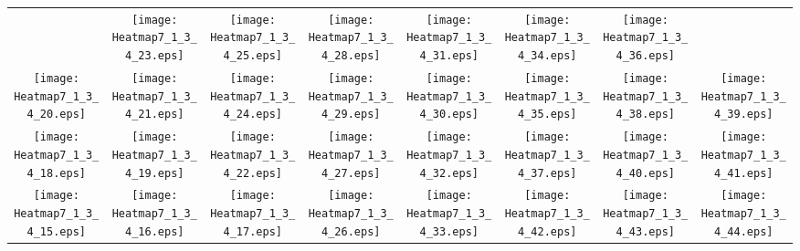 \documentclass{standalone}
\begin{document}
\renewcommand{\arraystretch}{0}
\setlength{\tabcolsep}{0pt}
\begin{tabular}{ *8{c} }
 & \texttt{[image: Heatmap7\_1\_3\_4\_23.eps]} & \texttt{[image: Heatmap7\_1\_3\_4\_25.eps]} & \texttt{[image: Heatmap7\_1\_3\_4\_28.eps]} & \texttt{[image: Heatmap7\_1\_3\_4\_31.eps]} & \texttt{[image: Heatmap7\_1\_3\_4\_34.eps]} & \texttt{[image: Heatmap7\_1\_3\_4\_36.eps]} &  \\
\texttt{[image: Heatmap7\_1\_3\_4\_20.eps]} & \texttt{[image: Heatmap7\_1\_3\_4\_21.eps]} & \texttt{[image: Heatmap7\_1\_3\_4\_24.eps]} & \texttt{[image: Heatmap7\_1\_3\_4\_29.eps]} & \texttt{[image: Heatmap7\_1\_3\_4\_30.eps]} & \texttt{[image: Heatmap7\_1\_3\_4\_35.eps]} & \texttt{[image: Heatmap7\_1\_3\_4\_38.eps]} & \texttt{[image: Heatmap7\_1\_3\_4\_39.eps]} \\
\texttt{[image: Heatmap7\_1\_3\_4\_18.eps]} & \texttt{[image: Heatmap7\_1\_3\_4\_19.eps]} & \texttt{[image: Heatmap7\_1\_3\_4\_22.eps]} & \texttt{[image: Heatmap7\_1\_3\_4\_27.eps]} & \texttt{[image: Heatmap7\_1\_3\_4\_32.eps]} & \texttt{[image: Heatmap7\_1\_3\_4\_37.eps]} & \texttt{[image: Heatmap7\_1\_3\_4\_40.eps]} & \texttt{[image: Heatmap7\_1\_3\_4\_41.eps]} \\
\texttt{[image: Heatmap7\_1\_3\_4\_15.eps]} & \texttt{[image: Heatmap7\_1\_3\_4\_16.eps]} & \texttt{[image: Heatmap7\_1\_3\_4\_17.eps]} & \texttt{[image: Heatmap7\_1\_3\_4\_26.eps]} & \texttt{[image: Heatmap7\_1\_3\_4\_33.eps]} & \texttt{[image: Heatmap7\_1\_3\_4\_42.eps]} & \texttt{[image: Heatmap7\_1\_3\_4\_43.eps]} & \texttt{[image: Heatmap7\_1\_3\_4\_44.eps]} \\

\end{tabular}
\end{document}
